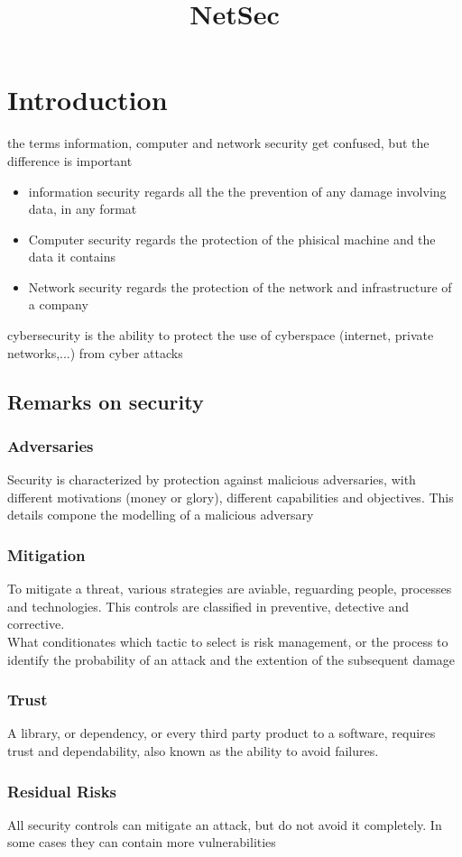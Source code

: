 \documentclass[12pt, a4paper]{article}
\title{NetSec}
\begin{document}
\section{Introduction}
the terms information, computer and network security get confused, but the difference is important
\begin{itemize}
    \item information security regards all the the prevention of any damage involving data, in any format
    \item Computer security regards the protection of the phisical machine and the data it contains
    \item Network security regards the protection of the network and infrastructure of a company
\end{itemize}
cybersecurity is the ability to protect the use of cyberspace (internet, private networks,...) from cyber
attacks

\subsection{Remarks on security}
\subsubsection*{Adversaries}
Security is characterized by protection against malicious adversaries, with different motivations (money
or glory), different capabilities and objectives. This details compone the modelling of a malicious 
adversary

\subsubsection*{Mitigation}
To mitigate a threat, various strategies are aviable, reguarding people, processes and technologies.
This controls are classified in preventive, detective and corrective.\\What conditionates which tactic 
to select is risk management, or the process to identify the probability of an attack and the extention 
of the subsequent damage

\subsubsection*{Trust}
A library, or dependency, or every third party product to a software, requires trust and dependability,
also known as the ability to avoid failures.

\subsubsection*{Residual Risks}
All security controls can mitigate an attack, but do not avoid it completely. In some cases they can contain more vulnerabilities
\end{document}
